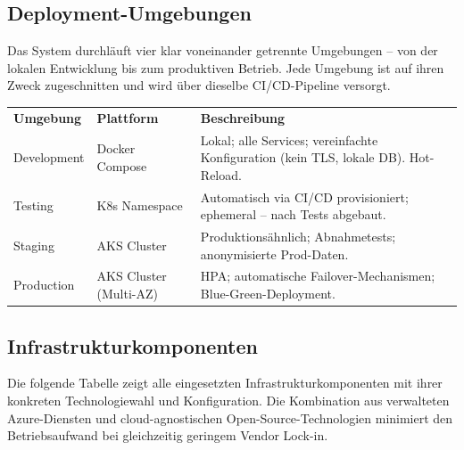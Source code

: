 \subsection{Deployment-Umgebungen}

Das System durchläuft vier klar voneinander getrennte Umgebungen -- von der lokalen
Entwicklung bis zum produktiven Betrieb. Jede Umgebung ist auf ihren Zweck
zugeschnitten und wird über dieselbe CI/CD-Pipeline versorgt.

\begin{tabularx}{\textwidth}{L{2.5cm} L{2.5cm} X}
  \color{white}\textbf{Umgebung} & \color{white}\textbf{Plattform} & \color{white}\textbf{Beschreibung} \\
  Development & Docker Compose & Lokal; alle Services; vereinfachte Konfiguration (kein TLS, lokale DB). Hot-Reload. \\
  Testing & K8s Namespace & Automatisch via CI/CD provisioniert; ephemeral -- nach Tests abgebaut. \\
  Staging & AKS Cluster & Produktionsähnlich; Abnahmetests; anonymisierte Prod-Daten. \\
  Production & AKS Cluster (Multi-AZ) & HPA; automatische Failover-Mechanismen; Blue-Green-Deployment. \\
\end{tabularx}

\subsection{Infrastrukturkomponenten}

Die folgende Tabelle zeigt alle eingesetzten Infrastrukturkomponenten mit ihrer
konkreten Technologiewahl und Konfiguration. Die Kombination aus verwalteten
Azure-Diensten und cloud-agnostischen Open-Source-Technologien minimiert den
Betriebsaufwand bei gleichzeitig geringem Vendor Lock-in.

